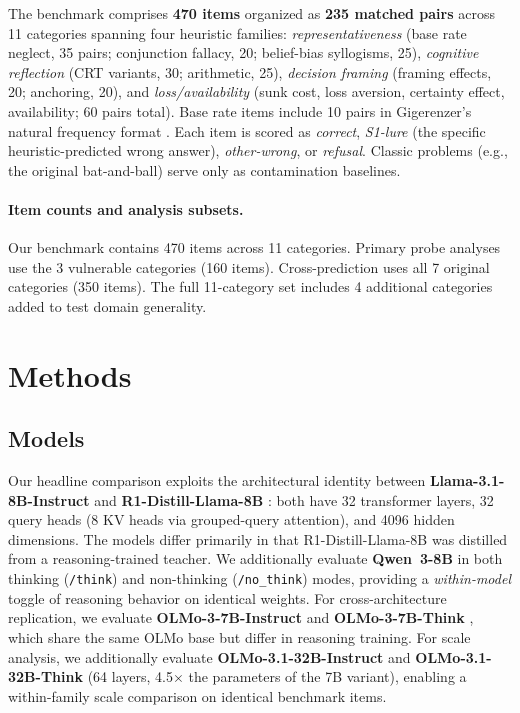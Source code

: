\documentclass{article}
\begin{document}
The benchmark comprises \textbf{470 items} organized as \textbf{235
matched pairs} across 11 categories spanning four heuristic families:
\emph{representativeness} (base rate neglect, 35 pairs; conjunction
fallacy, 20; belief-bias syllogisms, 25),
\emph{cognitive reflection} (CRT variants, 30; arithmetic, 25),
\emph{decision framing} (framing effects, 20; anchoring, 20), and
\emph{loss/availability} (sunk cost, loss aversion, certainty effect,
availability; 60 pairs total).  Base rate items include 10 pairs in
Gigerenzer's natural frequency format \citep{gigerenzer1995improve}.
Each item is scored as \emph{correct}, \emph{S1-lure} (the specific
heuristic-predicted wrong answer), \emph{other-wrong}, or \emph{refusal}.
Classic problems (e.g., the original bat-and-ball) serve only as
contamination baselines.

\paragraph{Item counts and analysis subsets.}
Our benchmark contains 470 items across 11 categories.  Primary probe
analyses use the 3 vulnerable categories (160 items).  Cross-prediction
uses all 7 original categories (350 items).  The full 11-category set
includes 4 additional categories added to test domain generality.


\section{Methods}
\label{sec:methods}

\subsection{Models}

Our headline comparison exploits the architectural identity between
\textbf{Llama-3.1-8B-Instruct} \citep{llama31} and
\textbf{R1-Distill-Llama-8B} \citep{deepseekr1}: both have 32
transformer layers, 32 query heads (8 KV heads via grouped-query
attention), and 4096 hidden dimensions.  The models differ primarily in that
R1-Distill-Llama-8B was distilled from a reasoning-trained teacher.  We
additionally evaluate \textbf{Qwen~3-8B} in both thinking (\texttt{/think})
and non-thinking (\texttt{/no\_think}) modes, providing a
\emph{within-model} toggle of reasoning behavior on identical weights.
For cross-architecture replication, we evaluate
\textbf{OLMo-3-7B-Instruct} and \textbf{OLMo-3-7B-Think}
\citep{olmo3}, which share the same OLMo base but differ in reasoning
training.  For scale analysis, we additionally evaluate
\textbf{OLMo-3.1-32B-Instruct} and \textbf{OLMo-3.1-32B-Think}
(64 layers, 4.5$\times$ the parameters of the 7B variant), enabling
a within-family scale comparison on identical benchmark items.
\end{document}
